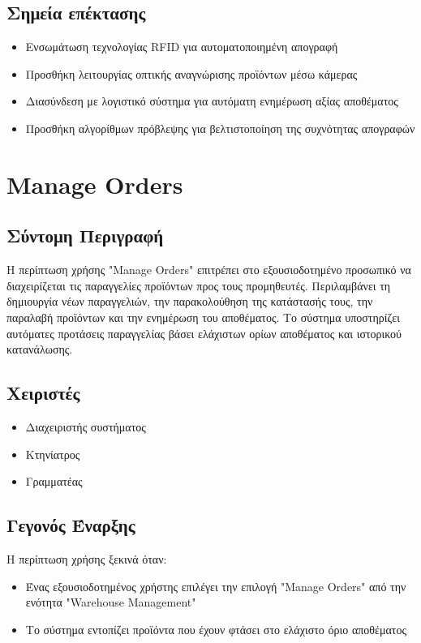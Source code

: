 \documentclass[12pt,a4paper,twoside]{book}
\begin{document}
\subsection{Σημεία επέκτασης}
\begin{itemize}
  \item Ενσωμάτωση τεχνολογίας RFID για αυτοματοποιημένη απογραφή
  \item Προσθήκη λειτουργίας οπτικής αναγνώρισης προϊόντων μέσω κάμερας
  \item Διασύνδεση με λογιστικό σύστημα για αυτόματη ενημέρωση αξίας αποθέματος
  \item Προσθήκη αλγορίθμων πρόβλεψης για βελτιστοποίηση της συχνότητας απογραφών
\end{itemize}

\section{Manage Orders}

\subsection{Σύντομη Περιγραφή}
Η περίπτωση χρήσης "Manage Orders" επιτρέπει στο εξουσιοδοτημένο προσωπικό να διαχειρίζεται τις παραγγελίες προϊόντων προς τους προμηθευτές. Περιλαμβάνει τη δημιουργία νέων παραγγελιών, την παρακολούθηση της κατάστασής τους, την παραλαβή προϊόντων και την ενημέρωση του αποθέματος. Το σύστημα υποστηρίζει αυτόματες προτάσεις παραγγελίας βάσει ελάχιστων ορίων αποθέματος και ιστορικού κατανάλωσης. %

\subsection{Χειριστές}
\begin{itemize}
  \item Διαχειριστής συστήματος
  \item Κτηνίατρος
  \item Γραμματέας
\end{itemize}

\subsection{Γεγονός Έναρξης}
Η περίπτωση χρήσης ξεκινά όταν:
\begin{itemize}
  \item Ένας εξουσιοδοτημένος χρήστης επιλέγει την επιλογή "Manage Orders" από την ενότητα "Warehouse Management" %
  \item Το σύστημα εντοπίζει προϊόντα που έχουν φτάσει στο ελάχιστο όριο αποθέματος
\end{itemize}
\end{document}
